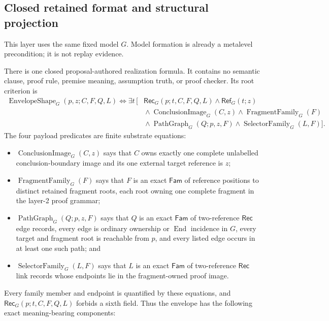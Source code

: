 \documentclass[11pt,twoside]{article}
\newcommand{\Rec}{\mathsf{Rec}}
\newcommand{\Fam}{\mathsf{Fam}}
\newcommand{\RefPos}{\mathsf{Ref}}
\begin{document}
\subsection{Closed retained format and structural projection}

This layer uses the same fixed model \(G\).  Model formation is already a
metalevel precondition; it is not replay evidence.

There is one closed proposal-authored realization formula.  It contains no
semantic clause, proof rule, premise meaning, assumption truth, or proof checker.
Its root criterion is
\[
\begin{split}
 \operatorname{EnvelopeShape}_G(p,z;C,F,Q,L)\Longleftrightarrow
 \exists t\,[{}&\Rec_G(p;t,C,F,Q,L)\land\RefPos_G(t;z)\\
 &{}\land\operatorname{ConclusionImage}_G(C,z)
 \land\operatorname{FragmentFamily}_G(F)\\
 &{}\land\operatorname{PathGraph}_G(Q;p,z,F)
 \land\operatorname{SelectorFamily}_G(L,F)].
\end{split}
\]
The four payload predicates are finite substrate equations:

\begin{itemize}[leftmargin=2em]
  \item \(\operatorname{ConclusionImage}_G(C,z)\) says that \(C\) owns exactly
        one complete unlabelled conclusion-boundary image and its one external
        target reference is \(z\);
  \item \(\operatorname{FragmentFamily}_G(F)\) says that \(F\) is an exact
        \(\Fam\) of reference positions to distinct retained fragment roots, each
        root owning one complete fragment in the layer-2 proof grammar;
  \item \(\operatorname{PathGraph}_G(Q;p,z,F)\) says that \(Q\) is an exact
        \(\Fam\) of two-reference \(\Rec\) edge records, every edge is ordinary
        ownership or \(\operatorname{End}\) incidence in \(G\), every target and
        fragment root is reachable from \(p\), and every listed edge occurs in at
        least one such path; and
  \item \(\operatorname{SelectorFamily}_G(L,F)\) says that \(L\) is an exact
        \(\Fam\) of two-reference \(\Rec\) link records whose endpoints lie in
        the fragment-owned proof image.
\end{itemize}

Every family member and endpoint is quantified by these equations, and
\(\Rec_G(p;t,C,F,Q,L)\) forbids a sixth field.  Thus the envelope has the following
exact meaning-bearing components:
\end{document}
